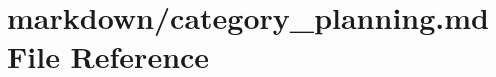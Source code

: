 \hypertarget{category__planning_8md}{}\section{markdown/category\+\_\+planning.md File Reference}
\label{category__planning_8md}
